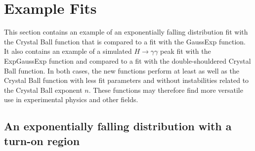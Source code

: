 \documentclass[10pt,letterpaper]{article}
\begin{document}
\section{Example Fits}

This section contains an example of an exponentially falling distribution fit with the Crystal Ball function that is compared to a fit with the GaussExp function. It also contains an example of a simulated $H\to\gamma\gamma$ peak fit with the ExpGaussExp function and compared to a fit with the double-shouldered Crystal Ball function. In both cases, the new functions perform at least as well as the Crystal Ball function with less fit parameters and without instabilities related to the Crystal Ball exponent $n$. These functions may therefore find more versatile use in experimental physics and other fields.

\subsection{An exponentially falling distribution with a turn-on region}
\end{document}

